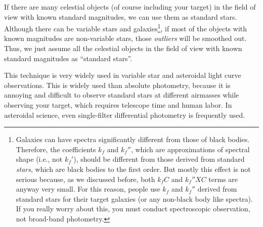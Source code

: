If there are many celestial objects (of course including your target) in the field of view with known standard magnitudes, we can use them as standard stars. Although there can be variable stars and galaxies\footnote{Galaxies can have spectra significantly different from those of black bodies. Therefore, the coefficients $ k_f $ and $ k_f'' $, which are approximations of spectral shape (i.e., not $ k_f' $), should be different from those derived from standard \textit{stars}, which are black bodies to the first order. But mostly this effect is not serious because, as we discussed before, both $ k_f C $ and $ k_f'' X C $ terms are anyway very small. For this reason, people use $ k_f $ and $ k_f'' $ derived from standard stars for their target galaxies (or any non-black body like spectra). If you really worry about this, you must conduct spectroscopic observation, not broad-band photometry.}, if most of the objects with known magnitudes are non-variable stars, those \textit{outliers} will be smoothed out. Thus, we just assume all the celestial objects in the field of view with known standard magnitudes as ``standard stars''. 

This technique is very widely used in variable star and asteroidal light curve observations. This is widely used than absolute photometry, because it is annoying and difficult to observe standard stars at different airmasses while observing your target, which requires telescope time and human labor. In asteroidal science, even single-filter differential photometry is frequently used. 


